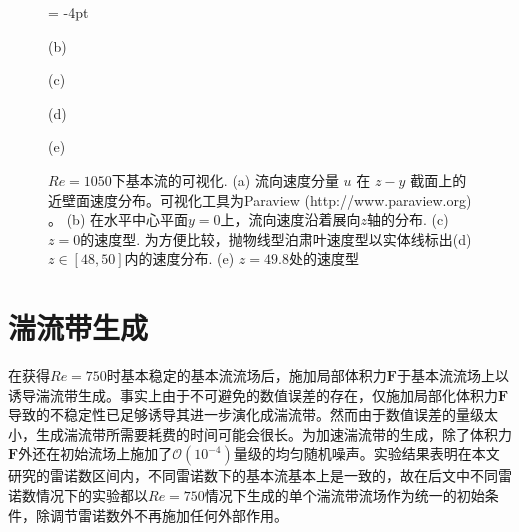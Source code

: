 \begin{figure}[H]
\centerline
	\centering
	\subfigcapskip = -4pt
	\begin{minipage}[h]{0.75\linewidth}
	\centering
	\end{minipage}
	\quad
	\begin{minipage}[h]{0.11\linewidth}
	\end{minipage}
	\quad
	\begin{minipage}[h]{0.45\linewidth}
	\centerline {(b)}
	\end{minipage}
	\quad
	\begin{minipage}[h]{0.45\linewidth}
	\centering
	\centerline {(c)}
	\end{minipage}
	\centering
	\begin{minipage}[h]{0.45\linewidth}
	\centerline {(d)}
	\end{minipage}
	\quad
	\begin{minipage}[h]{0.45\linewidth}
	\centering
	\centerline {(e)}
	\end{minipage}
	\centering
	\caption{$Re = 1050$下基本流的可视化. (a) 流向速度分量 $u$ 在 $z-y$ 截面上的近壁面速度分布。可视化工具为Paraview (http://www.paraview.org) 。 (b) 在水平中心平面$y=0$上，流向速度沿着展向$z$轴的分布. (c) $z=0$的速度型. 为方便比较，抛物线型泊肃叶速度型以实体线标出(d)  $z\in [48,50]$内的速度分布. (e) $z = 49.8$处的速度型 }
\label{fig:cornerplot}
\end{figure}

\section{湍流带生成}
在获得$Re = 750$时基本稳定的基本流流场后，施加局部体积力$\bm F$于基本流流场上以诱导湍流带生成。事实上由于不可避免的数值误差的存在，仅施加局部化体积力$\bm F$导致的不稳定性已足够诱导其进一步演化成湍流带\cite{Song2020}。然而由于数值误差的量级太小，生成湍流带所需要耗费的时间可能会很长。为加速湍流带的生成，除了体积力$\bm F$外还在初始流场上施加了$\mathcal{O}(10^{-4})$量级的均匀随机噪声\cite{Song2020}。实验结果表明在本文研究的雷诺数区间内，不同雷诺数下的基本流基本上是一致的，故在后文中不同雷诺数情况下的实验都以$Re = 750$情况下生成的单个湍流带流场作为统一的初始条件，除调节雷诺数外不再施加任何外部作用。

